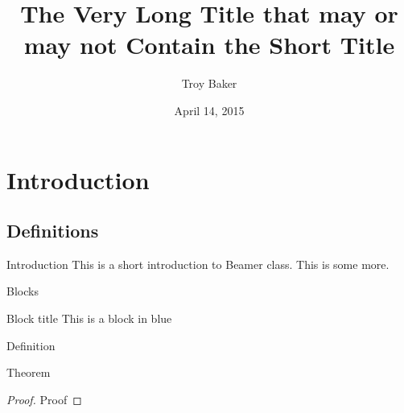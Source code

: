 \documentclass{beamer}
\title[Short Title]{The Very Long Title that may or may not Contain the Short Title}
\author{Troy Baker}
\institute{University of Florida}
\date{April 14, 2015}
\begin{document}


\begin{frame}
    \titlepage
\end{frame}

\section{Introduction}
\subsection{Definitions}
\begin{frame}{Introduction}
    This is a short introduction to Beamer class.
    \pause
    This is some more.
\end{frame}


\begin{frame}{Blocks}
    \begin{block}{Block title}
        This is a block in blue
    \end{block}

    \begin{definition}
        Definition
    \end{definition}

    \begin{theorem}
        Theorem
    \end{theorem}

    \begin{proof}
        Proof
    \end{proof}
\end{frame}
\end{document}
